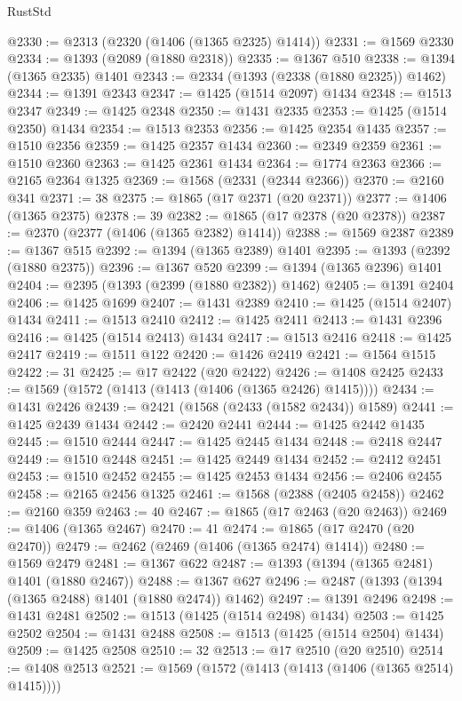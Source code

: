 \begin{lexlean}{RustStd}
\begin{coremodule}
@2330 := @2313 (@2320 (@1406 (@1365 @2325) @1414))
@2331 := @1569 @2330
@2334 := @1393 (@2089 (@1880 @2318))
@2335 := @1367 @510
@2338 := @1394 (@1365 @2335) @1401
@2343 := @2334 (@1393 (@2338 (@1880 @2325)) @1462)
@2344 := @1391 @2343
@2347 := @1425 (@1514 @2097) @1434
@2348 := @1513 @2347
@2349 := @1425 @2348
@2350 := @1431 @2335
@2353 := @1425 (@1514 @2350) @1434
@2354 := @1513 @2353
@2356 := @1425 @2354 @1435
@2357 := @1510 @2356
@2359 := @1425 @2357 @1434
@2360 := @2349 @2359
@2361 := @1510 @2360
@2363 := @1425 @2361 @1434
@2364 := @1774 @2363
@2366 := @2165 @2364 @1325
@2369 := @1568 (@2331 (@2344 @2366))
@2370 := @2160 @341
@2371 := 38
@2375 := @1865 (@17 @2371 (@20 @2371))
@2377 := @1406 (@1365 @2375)
@2378 := 39
@2382 := @1865 (@17 @2378 (@20 @2378))
@2387 := @2370 (@2377 (@1406 (@1365 @2382) @1414))
@2388 := @1569 @2387
@2389 := @1367 @515
@2392 := @1394 (@1365 @2389) @1401
@2395 := @1393 (@2392 (@1880 @2375))
@2396 := @1367 @520
@2399 := @1394 (@1365 @2396) @1401
@2404 := @2395 (@1393 (@2399 (@1880 @2382)) @1462)
@2405 := @1391 @2404
@2406 := @1425 @1699
@2407 := @1431 @2389
@2410 := @1425 (@1514 @2407) @1434
@2411 := @1513 @2410
@2412 := @1425 @2411
@2413 := @1431 @2396
@2416 := @1425 (@1514 @2413) @1434
@2417 := @1513 @2416
@2418 := @1425 @2417
@2419 := @1511 @122
@2420 := @1426 @2419
@2421 := @1564 @1515
@2422 := 31
@2425 := @17 @2422 (@20 @2422)
@2426 := @1408 @2425
@2433 := @1569 (@1572 (@1413 (@1413 (@1406 (@1365 @2426) @1415))))
@2434 := @1431 @2426
@2439 := @2421 (@1568 (@2433 (@1582 @2434)) @1589)
@2441 := @1425 @2439 @1434
@2442 := @2420 @2441
@2444 := @1425 @2442 @1435
@2445 := @1510 @2444
@2447 := @1425 @2445 @1434
@2448 := @2418 @2447
@2449 := @1510 @2448
@2451 := @1425 @2449 @1434
@2452 := @2412 @2451
@2453 := @1510 @2452
@2455 := @1425 @2453 @1434
@2456 := @2406 @2455
@2458 := @2165 @2456 @1325
@2461 := @1568 (@2388 (@2405 @2458))
@2462 := @2160 @359
@2463 := 40
@2467 := @1865 (@17 @2463 (@20 @2463))
@2469 := @1406 (@1365 @2467)
@2470 := 41
@2474 := @1865 (@17 @2470 (@20 @2470))
@2479 := @2462 (@2469 (@1406 (@1365 @2474) @1414))
@2480 := @1569 @2479
@2481 := @1367 @622
@2487 := @1393 (@1394 (@1365 @2481) @1401 (@1880 @2467))
@2488 := @1367 @627
@2496 := @2487 (@1393 (@1394 (@1365 @2488) @1401 (@1880 @2474)) @1462)
@2497 := @1391 @2496
@2498 := @1431 @2481
@2502 := @1513 (@1425 (@1514 @2498) @1434)
@2503 := @1425 @2502
@2504 := @1431 @2488
@2508 := @1513 (@1425 (@1514 @2504) @1434)
@2509 := @1425 @2508
@2510 := 32
@2513 := @17 @2510 (@20 @2510)
@2514 := @1408 @2513
@2521 := @1569 (@1572 (@1413 (@1413 (@1406 (@1365 @2514) @1415))))

\end{coremodule}
\end{lexlean}
